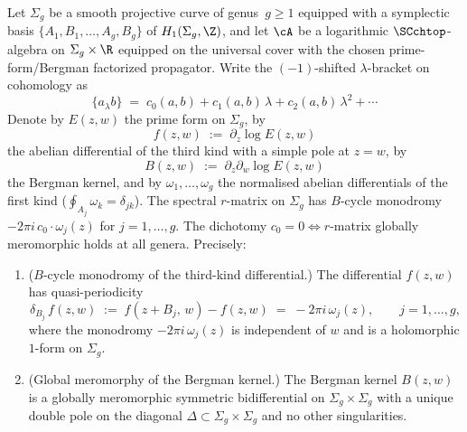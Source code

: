\begin{theorem}
\label{thm:higher-genus-spectral-dichotomy}
\label{thm:genus-g-curvature-braiding}%
Let $\Sigma_g$ be a smooth projective curve of genus~$g \ge 1$
equipped with a symplectic basis $\{A_1, B_1, \dotsc, A_g, B_g\}$
of $H_1(\Sigma_g, \Z)$, and let $\cA$ be a logarithmic
$\SCchtop$-algebra on $\Sigma_g \times \R$ equipped on the universal
cover with the chosen prime-form/Bergman factorized propagator. Write the
$(-1)$-shifted $\lambda$-bracket on cohomology as
\[
\{a {}_\lambda b\}
\;=\;
c_0(a,b) + c_1(a,b)\,\lambda + c_2(a,b)\,\lambda^2 + \cdots
\]
Denote by $E(z,w)$ the prime form on $\Sigma_g$, by
\[
f(z,w) \;:=\; \partial_z \log E(z,w)
\]
the abelian differential of the third kind with a simple
pole at $z = w$, by
\[
B(z,w) \;:=\; \partial_z \partial_w \log E(z,w)
\]
the Bergman kernel, and by $\omega_1, \dotsc, \omega_g$ the
normalised abelian differentials of the first kind
\textup{(}$\oint_{A_j} \omega_k = \delta_{jk}$\textup{)}.
The spectral $r$-matrix on $\Sigma_g$ has $B$-cycle monodromy
$-2\pi i\, c_0 \cdot \omega_j(z)$ for $j = 1, \dotsc, g$.
The dichotomy $c_0 = 0 \Longleftrightarrow r$-matrix globally
meromorphic holds at all genera. Precisely:

\begin{enumerate}[label=\textup{(\alph*)}]
\item \label{item:genus-g-B-monodromy}
\textup{($B$-cycle monodromy of the third-kind differential.)}
The differential $f(z,w)$ has quasi-periodicity
\begin{equation}
\label{eq:genus-g-B-monodromy}
\delta_{B_j}\, f(z,w)
\;:=\;
f(z + B_j,\, w) - f(z,w)
\;=\;
-2\pi i\, \omega_j(z),
\qquad j = 1, \dotsc, g,
\end{equation}
where the monodromy $-2\pi i\, \omega_j(z)$ is independent of
$w$ and is a holomorphic $1$-form on $\Sigma_g$.

\item \label{item:genus-g-bergman-global}
\textup{(Global meromorphy of the Bergman kernel.)}
The Bergman kernel $B(z,w)$ is a globally meromorphic symmetric
bidifferential on $\Sigma_g \times \Sigma_g$ with a unique
double pole on the diagonal $\Delta \subset \Sigma_g \times
\Sigma_g$ and no other singularities.


\end{enumerate}
\end{theorem}

